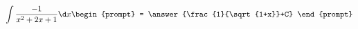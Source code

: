 \documentclass{ximera}
\author{Steven Gubkin}
\begin{document}
\begin{exercise}


\[
\int \frac{-1}{x^2+2x+1} \d x \begin{prompt} = \answer{\frac{1}{\sqrt{1+x}}+C} \end{prompt}
\]

\end{exercise}
\end{document}
